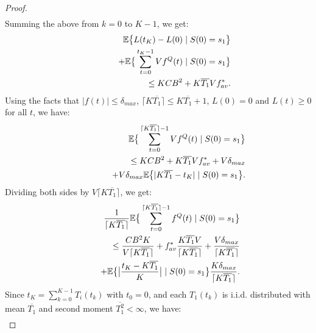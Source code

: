 \documentclass[journal]{IEEEtran}
\newcommand{\expect}[1]{\mathbb{E}\big\{#1\big\}}
\begin{document}
\begin{proof}
\begin{eqnarray}
\end{eqnarray}
Summing the above from $k=0$ to $K-1$, we get:
\begin{eqnarray}
\hspace{-.3in}&&\expect{L(t_{K})-L(0)\left.|\right. S(0)=s_1} \label{eq:thesum-ineq}\\
\hspace{-.3in}&& \qquad\qquad\quad+ \expect{\sum_{t=0}^{t_{K}-1}Vf^Q(t)\left.|\right. S(0)=s_1}\nonumber\\
\hspace{-.3in}&& \qquad\qquad\quad \leq KCB^2 + K\overline{T_{1}} Vf^*_{av}.\nonumber
\end{eqnarray}
Using the facts that $|f(t)|\leq\delta_{max}$, $\lceil K\overline{T_1}\rceil\leq K\overline{T_1}+1$, $L(0)=0$ and $L(t)\geq0$ for all $t$, we have:
\begin{eqnarray}
\hspace{-.3in}&&\expect{\sum_{t=0}^{\lceil K\overline{T_1}\rceil-1}Vf^Q(t)\left.|\right. S(0)=s_1}\nonumber\\
\hspace{-.3in}&&\qquad \leq KCB^2 + K\overline{T_{1}} Vf^*_{av} + V\delta_{max}\\
\hspace{-.3in}&&\qquad\qquad\qquad+V\delta_{max}\expect{|K\overline{T_1}-t_K|\left.|\right. S(0)=s_1}.\nonumber
\end{eqnarray}
Dividing both sides by $V\lceil K\overline{T_1}\rceil$, we get: 
\begin{eqnarray}
\hspace{-.3in}&&\frac{1}{\lceil K\overline{T_1}\rceil}\expect{\sum_{t=0}^{\lceil K\overline{T_1}\rceil-1}f^Q(t)\left.|\right. S(0)=s_1} \label{eq:expsamplepath_bound}\\
\hspace{-.3in}&& \qquad\quad\leq \frac{CB^2K}{V\lceil K\overline{T_1} \rceil} +  f^*_{av}\frac{K\overline{T_1}V}{\lceil K\overline{T_1} \rceil} +\frac{V\delta_{max}}{\lceil K\overline{T_1} \rceil}\nonumber\\
\hspace{-.3in}&& \qquad\qquad+ \expect{\big|\frac{t_K-K\overline{T_1}}{K}\big|\left.|\right. S(0)=s_1}\frac{K\delta_{max}}{\lceil K\overline{T_1} \rceil}.\nonumber
\end{eqnarray}
Since $t_K=\sum_{k=0}^{K-1}T_i(t_k)$ with $t_0=0$, and each $T_1(t_k)$ is i.i.d. distributed with mean $\overline{T_1}$ and second moment $\overline{T_1^2}<\infty$, we have:
\begin{eqnarray}

\end{eqnarray}
\end{proof}
\end{document}
